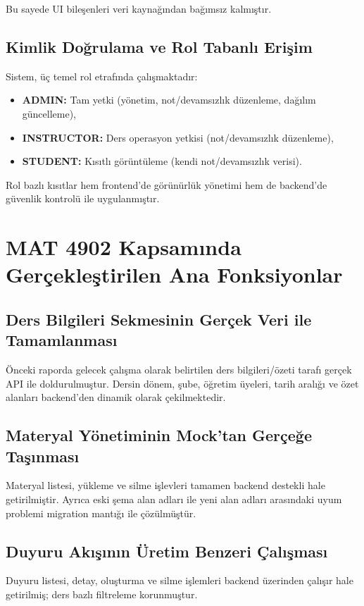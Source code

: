 \documentclass[12pt,a4paper]{article}
\begin{document}
Bu sayede UI bileşenleri veri kaynağından bağımsız kalmıştır.

\subsection{Kimlik Doğrulama ve Rol Tabanlı Erişim}
Sistem, üç temel rol etrafında çalışmaktadır:

\begin{itemize}[leftmargin=*]
    \item \textbf{ADMIN:} Tam yetki (yönetim, not/devamsızlık düzenleme, dağılım güncelleme),
    \item \textbf{INSTRUCTOR:} Ders operasyon yetkisi (not/devamsızlık düzenleme),
    \item \textbf{STUDENT:} Kısıtlı görüntüleme (kendi not/devamsızlık verisi).
\end{itemize}

Rol bazlı kısıtlar hem frontend'de görünürlük yönetimi hem de backend'de güvenlik kontrolü ile uygulanmıştır.

\section{MAT 4902 Kapsamında Gerçekleştirilen Ana Fonksiyonlar}

\subsection{Ders Bilgileri Sekmesinin Gerçek Veri ile Tamamlanması}
Önceki raporda gelecek çalışma olarak belirtilen ders bilgileri/özeti tarafı gerçek API ile doldurulmuştur. Dersin dönem, şube, öğretim üyeleri, tarih aralığı ve özet alanları backend'den dinamik olarak çekilmektedir.

\subsection{Materyal Yönetiminin Mock'tan Gerçeğe Taşınması}
Materyal listesi, yükleme ve silme işlevleri tamamen backend destekli hale getirilmiştir. Ayrıca eski şema alan adları ile yeni alan adları arasındaki uyum problemi migration mantığı ile çözülmüştür.

\subsection{Duyuru Akışının Üretim Benzeri Çalışması}
Duyuru listesi, detay, oluşturma ve silme işlemleri backend üzerinden çalışır hale getirilmiş; ders bazlı filtreleme korunmuştur.
\end{document}
